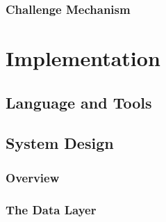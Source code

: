 \documentclass[12pt]{report}
\begin{document}

\subsection{Challenge Mechanism}


\chapter{Implementation} \label{chap:impl}
\section{Language and Tools}


\section{System Design}
\subsection{Overview}


\subsection{The Data Layer}

\end{document}
